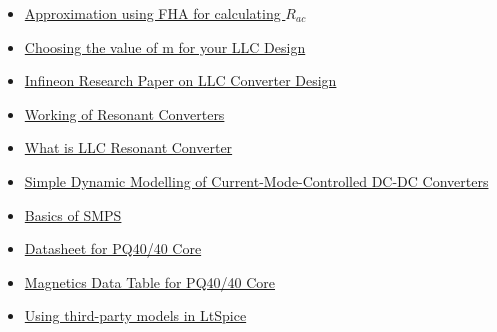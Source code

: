 \begin{itemize}
    \item \href{https://www.youtube.com/watch?v=qDT5xw1kgZs&t=249s}{Approximation using FHA for calculating $R_{ac}$}
    \item \href{https://www.youtube.com/watch?v=qDT5xw1kgZs&t=391s}{Choosing the value of m for your LLC Design}
    \item \href{https://www.infineon.com/dgdl/Application_Note_Resonant+LLC+Converter+Operation+and+Design_Infineon.pdf?fileId=db3a30433a047ba0013a4a60e3be64a1}{Infineon Research Paper on LLC Converter Design}
    \item \href{https://www.youtube.com/watch?v=V1MIky4__4A}{Working of Resonant Converters}
    \item \href{https://www.youtube.com/watch?v=TVQuPWtxN34}{What is LLC Resonant Converter}
    \item \href{https://www.youtube.com/watch?v=2fVi3LH3d70}{Simple Dynamic Modelling of Current-Mode-Controlled DC-DC Converters}
    \item \href{https://www.youtube.com/watch?v=_v_wENwFNLM}{Basics of SMPS}
    \item \href{https://product.tdk.com/en/search/ferrite/ferrite/ferrite-core/info?part_no=PC47PQ40/40Z-12}{Datasheet for PQ40/40 Core}
    \item \href{https://web.eecs.utk.edu/~dcostine/ECE482/Spring2014/materials/magnetics/MagneticsTables.pdf}{Magnetics Data Table for PQ40/40 Core}
    \item \href{https://www.analog.com/en/resources/media-center/videos/5579239882001.html}{Using third-party models in LtSpice}
\end{itemize}